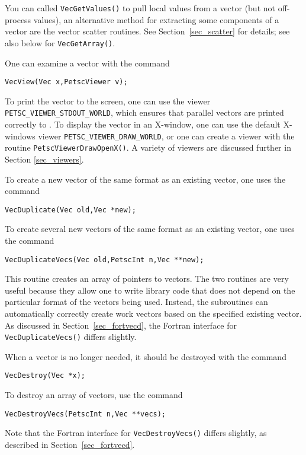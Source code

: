 You can called \lstinline{VecGetValues()} to pull local values from a vector (but
not off-process values),
an alternative method for extracting some components of a vector are
the vector scatter routines.  
See Section~\ref{sec_scatter} for details; see also
below for \lstinline{VecGetArray()}.

One can examine a vector with the command
\begin{lstlisting}
VecView(Vec x,PetscViewer v);
\end{lstlisting}
To print the vector to the screen, one can use the viewer
\lstinline{PETSC_VIEWER_STDOUT_WORLD},
which ensures that parallel vectors are printed correctly to
. To display the vector in an X-window, one can use the
default X-windows viewer \lstinline{PETSC_VIEWER_DRAW_WORLD},
or one can create a viewer with the
routine \lstinline{PetscViewerDrawOpenX()}.  A variety of viewers are discussed
further in Section \ref{sec_viewers}.

To create a new vector of the same format as an existing vector, one uses
the command
\begin{lstlisting}
VecDuplicate(Vec old,Vec *new);
\end{lstlisting}
To create several new vectors of the same format as an existing vector,
one uses the command
\begin{lstlisting}
VecDuplicateVecs(Vec old,PetscInt n,Vec **new);
\end{lstlisting}
This routine creates an array of pointers to vectors. The two routines
are very useful because they allow one to write library code that does
not depend on the particular format of the vectors being used. Instead,
the subroutines can automatically correctly create work vectors
based on the specified existing vector.  As discussed in
Section~\ref{sec_fortvecd}, the Fortran interface for \lstinline{VecDuplicateVecs()}
differs slightly.

When a vector is no longer needed, it should be destroyed with the
command
\begin{lstlisting}
VecDestroy(Vec *x);
\end{lstlisting}
To destroy an array of vectors, use the command
\begin{lstlisting}
VecDestroyVecs(PetscInt n,Vec **vecs);
\end{lstlisting}
Note that the Fortran interface for \lstinline{VecDestroyVecs()} differs slightly,
as described in Section~\ref{sec_fortvecd}.

